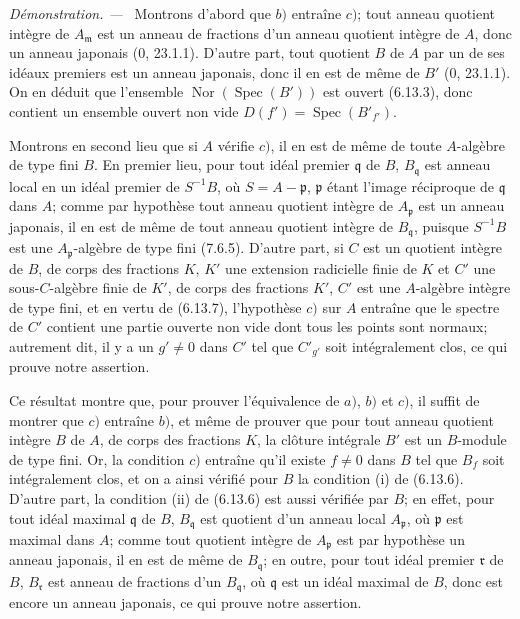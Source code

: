 \documentclass[10pt,oneside]{book}
\newcommand{\oldpage}[2][]{%
  \setcounter{footnote}{0}%
  \marginpar{\scriptsize\textbf{#1}~|~#2}\ignorespaces}
\newenvironment{proof}{%
  \par\medskip\noindent\textit{Démonstration. ---\ }}{\par}
\begin{document}
\begin{proof}
Montrons d'abord que $b)$ entraîne $c)$; tout anneau quotient intègre de
$A_{\mathfrak m}$ est un anneau de fractions d'un anneau quotient intègre de
$A$, donc un anneau japonais (0, 23.1.1). D'autre part, tout quotient $B$ de
$A$ par un de ses idéaux premiers est un anneau japonais, donc il en est de
même de $B'$ (0, 23.1.1). On en déduit que l'ensemble
$\operatorname{Nor}(\operatorname{Spec}(B'))$ est ouvert (6.13.3), donc
contient un ensemble ouvert non vide
$D(f')=\operatorname{Spec}(B'_{f'})$.

\oldpage[IV-2]{213}

Montrons en second lieu que si $A$ vérifie $c)$, il en est de même de toute
$A$-algèbre de type fini $B$. En premier lieu, pour tout idéal premier
$\mathfrak q$ de $B$, $B_{\mathfrak q}$ est anneau local en un idéal premier
de $S^{-1}B$, où $S=A-\mathfrak p$, $\mathfrak p$ étant l'image réciproque de
$\mathfrak q$ dans $A$; comme par hypothèse tout anneau quotient intègre de
$A_{\mathfrak p}$ est un anneau japonais, il en est de même de tout anneau
quotient intègre de $B_{\mathfrak q}$, puisque $S^{-1}B$ est une
$A_{\mathfrak p}$-algèbre de type fini (7.6.5). D'autre part, si $C$ est un
quotient intègre de $B$, de corps des fractions $K$, $K'$ une extension
radicielle finie de $K$ et $C'$ une sous-$C$-algèbre finie de $K'$, de corps
des fractions $K'$, $C'$ est une $A$-algèbre intègre de type fini, et en vertu
de (6.13.7), l'hypothèse $c)$ sur $A$ entraîne que le spectre de $C'$ contient
une partie ouverte non vide dont tous les points sont normaux; autrement dit,
il y a un $g'\neq0$ dans $C'$ tel que $C'_{g'}$ soit intégralement clos, ce qui
prouve notre assertion.

Ce résultat montre que, pour prouver l'équivalence de $a)$, $b)$ et $c)$, il
suffit de montrer que $c)$ entraîne $b)$, et même de prouver que pour tout
anneau quotient intègre $B$ de $A$, de corps des fractions $K$, la clôture
intégrale $B'$ est un $B$-module de type fini. Or, la condition $c)$ entraîne
qu'il existe $f\neq0$ dans $B$ tel que $B_f$ soit intégralement clos, et on a
ainsi vérifié pour $B$ la condition (i) de (6.13.6). D'autre part, la condition
(ii) de (6.13.6) est aussi vérifiée par $B$; en effet, pour tout idéal maximal
$\mathfrak q$ de $B$, $B_{\mathfrak q}$ est quotient d'un anneau local
$A_{\mathfrak p}$, où $\mathfrak p$ est maximal dans $A$; comme
tout quotient intègre de $A_{\mathfrak p}$ est par hypothèse un anneau japonais, il en est de même de
$B_{\mathfrak q}$; en outre, pour tout idéal premier $\mathfrak r$ de $B$,
$B_{\mathfrak r}$ est anneau de fractions d'un $B_{\mathfrak q}$, où
$\mathfrak q$ est un idéal maximal de $B$, donc est encore un anneau japonais,
ce qui prouve notre assertion.


\end{proof}
\end{document}
